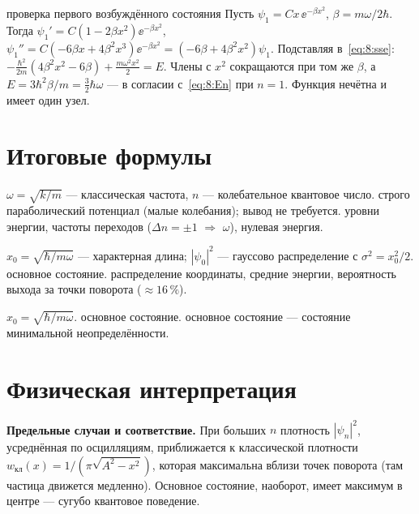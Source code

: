 \begin{derivation}[label=der:8:psi1]{проверка первого возбуждённого состояния}
Пусть $\psi_1=Cx\,\ee^{-\beta x^2}$, $\beta=m\omega/2\hbar$. Тогда
$\psi_1'=C(1-2\beta x^2)\ee^{-\beta x^2}$,
$\psi_1''=C(-6\beta x+4\beta^2x^3)\ee^{-\beta x^2}=(-6\beta+4\beta^2x^2)\psi_1$.
Подставляя в~\eqref{eq:8:sse}: $-\frac{\hbar^2}{2m}(4\beta^2x^2-6\beta)+\frac{m\omega^2x^2}{2}=E$. Члены с
$x^2$ сокращаются при том же $\beta$, а $E=3\hbar^2\beta/m=\frac32\hbar\omega$ — в согласии с~\eqref{eq:8:En}
при $n=1$. Функция нечётна и имеет один узел.
\end{derivation}

\section{Итоговые формулы}

 {$\omega=\sqrt{k/m}$ — классическая частота, $n$ — колебательное квантовое число.}
 {строго параболический потенциал (малые колебания); вывод не требуется.}
 {уровни энергии, частоты переходов ($\Delta n=\pm1$ $\Rightarrow$ $\omega$), нулевая энергия.}

 {$x_0=\sqrt{\hbar/m\omega}$ — характерная длина; $|\psi_0|^2$ — гауссово распределение с $\sigma^2=x_0^2/2$.}
 {основное состояние.}
 {распределение координаты, средние энергии, вероятность выхода за точки поворота ($\approx16\,\%$).}

 {$x_0=\sqrt{\hbar/m\omega}$.}
 {основное состояние.}
 {основное состояние — состояние минимальной неопределённости.}

\section{Физическая интерпретация}

\textbf{Предельные случаи и соответствие.} При больших $n$ плотность $|\psi_n|^2$, усреднённая по
осцилляциям, приближается к классической плотности $w_{\text{кл}}(x)=1/(\pi\sqrt{A^2-x^2})$, которая
максимальна вблизи точек поворота (там частица движется медленно). Основное состояние, наоборот,
имеет максимум в центре — сугубо квантовое поведение.

